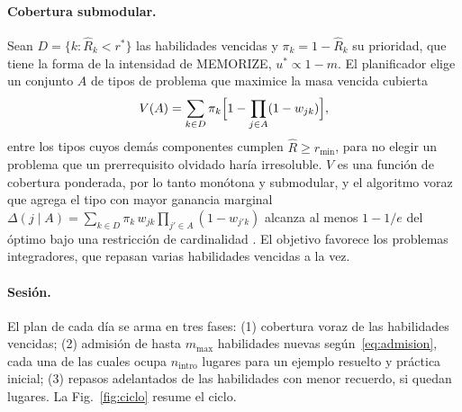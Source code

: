 \documentclass[runningheads]{llncs}
\newcommand{\Rh}{\hat R}
\newcommand{\rstar}{r^{\ast}}
\begin{document}
\paragraph{Cobertura submodular.} Sean $D=\{k:\Rh_k<\rstar\}$ las habilidades vencidas y $\pi_k=1-\Rh_k$ su prioridad, que tiene la forma de la intensidad de MEMORIZE, $u^\ast\propto1-m$. El planificador elige un conjunto $A$ de tipos de problema que maximice la masa vencida cubierta
\begin{equation}
V(A)=\sum_{k\in D}\pi_k\Bigl[1-\prod_{j\in A}(1-w_{jk})\Bigr],
\label{eq:cobertura}
\end{equation}
entre los tipos cuyos demás componentes cumplen $\Rh\ge r_{\min}$, para no elegir un problema que un prerrequisito olvidado haría irresoluble. $V$ es una función de cobertura ponderada, por lo tanto monótona y submodular, y el algoritmo voraz que agrega el tipo con mayor ganancia marginal $\Delta(j\mid A)=\sum_{k\in D}\pi_k\,w_{jk}\prod_{j'\in A}(1-w_{j'k})$ alcanza al menos $1-1/e$ del óptimo bajo una restricción de cardinalidad \cite{nemhauser1978}. El objetivo favorece los problemas integradores, que repasan varias habilidades vencidas a la vez.

\paragraph{Sesión.} El plan de cada día se arma en tres fases: (1) cobertura voraz de las habilidades vencidas; (2) admisión de hasta $m_{\max}$ habilidades nuevas según~\eqref{eq:admision}, cada una de las cuales ocupa $n_{\mathrm{intro}}$ lugares para un ejemplo resuelto y práctica inicial; (3) repasos adelantados de las habilidades con menor recuerdo, si quedan lugares. La Fig.~\ref{fig:ciclo} resume el ciclo.
\end{document}

